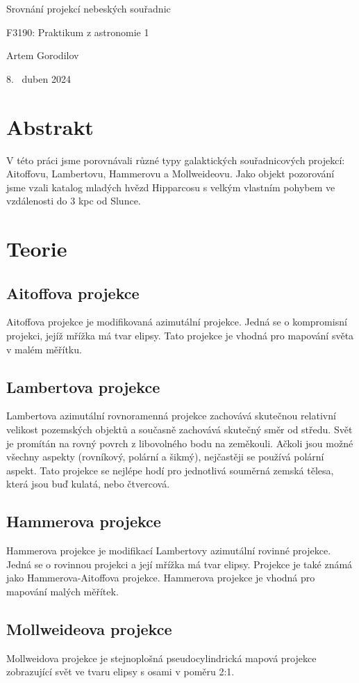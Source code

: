 \documentclass[a4paper,11pt]{article}
\begin{document}
\hline
\begin{center}
\bigskip
\huge Srovnání projekcí nebeských souřadnic
\vspace{0.5cm}
\par \large F3190: Praktikum z astronomie 1
\par \large Artem Gorodilov
\vspace{0.5cm}
\par \large 8. ~duben 2024
\bigskip
\end{center}
\hline
\bigskip


\vskip10pt
    \begin{minipage}[t]{0.5\textwidth} 
        \section{Abstrakt}    
            V této práci jsme porovnávali různé typy galaktických souřadnicových projekcí: Aitoffovu, Lambertovu, Hammerovu a Mollweideovu. Jako objekt pozorování jsme vzali katalog mladých hvězd Hipparcosu s velkým vlastním pohybem ve vzdálenosti do 3 kpc od Slunce. 
        \section{Teorie}
            \subsection{Aitoffova projekce \cite{Aitoff}}
                Aitoffova projekce je modifikovaná azimutální projekce. Jedná se o kompromisní projekci, jejíž mřížka má tvar elipsy. Tato projekce je vhodná pro mapování světa v malém měřítku.
            \subsection{Lambertova projekce \cite{Lambert}}
                Lambertova azimutální rovnoramenná projekce zachovává skutečnou relativní velikost pozemských objektů a současně zachovává skutečný směr od středu. Svět je promítán na rovný povrch z libovolného bodu na zeměkouli. Ačkoli jsou možné všechny aspekty (rovníkový, polární a šikmý), nejčastěji se používá polární aspekt. Tato projekce se nejlépe hodí pro jednotlivá souměrná zemská tělesa, která jsou buď kulatá, nebo čtvercová.
            \subsection{Hammerova projekce \cite{Hammer}}
                Hammerova projekce je modifikací Lambertovy azimutální rovinné projekce. Jedná se o rovinnou projekci a její mřížka má tvar elipsy. Projekce je také známá jako Hammerova-Aitoffova projekce. Hammerova projekce je vhodná pro mapování malých měřítek. 
            \subsection{Mollweideova projekce \cite{Mollweide}}
                Mollweidova projekce je stejnoplošná pseudocylindrická mapová projekce zobrazující svět ve tvaru elipsy s osami v poměru 2:1. 
    \end{minipage}
\end{document}
